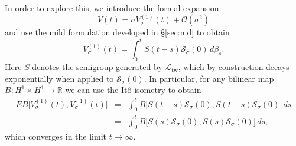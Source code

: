 \documentclass[10pt]{articleHJ}
\renewcommand{\O}{\ensuremath{\mathcal{O}}}
\newcommand{\Real}{\mathbb{R}}							%
\numberwithin{equation}{section}
\begin{document}
In order to explore this, we introduce the formal expansion
\begin{equation}
V(t) = \sigma V^{(1)}_{\sigma}(t) + \O (\sigma^2)
\end{equation}
and use the mild formulation
developed in \S\ref{sec:md}
to obtain
\begin{equation}
\label{eq:mr:process:for:v}
V^{(1)}_{\sigma}(t) = \int_0^t S (t - s) \mathcal{S}_{\sigma}(0) \, d \beta_s .
\end{equation}
Here $S$ denotes the semigroup generated by $\mathcal{L}_{\mathrm{tw}}$,
which by construction decays exponentially when applied to $\mathcal{S}_{\sigma}(0)$.
In particular, for any
bilinear map $B: H^1 \times H^1 \to \Real$ we can use the It{\^o} isometry
to obtain
\begin{equation}
\begin{array}{lcl}
E B \big[
  V^{(1)}_{\sigma}(t) ,V^{(1)}_{\sigma}(t)
\big]
  & = &  \int_0^t  B \big[ S(t-s) \mathcal{S}_{\sigma}(0) , S(t-s) \mathcal{S}_{\sigma}(0) \big] \, ds
\\[0.2cm]
  & = &  \int_0^t  B \big[ S(s) \mathcal{S}_{\sigma}(0) , S(s) \mathcal{S}_{\sigma}(0) \big] \, ds ,
\end{array}
\end{equation}
which converges in the limit $t \to \infty$.
\end{document}
